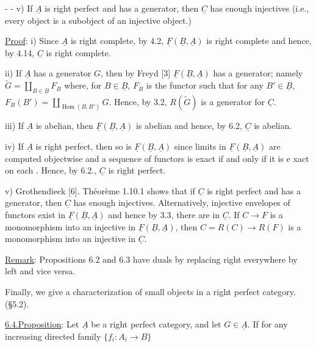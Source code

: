 -  -
v) If $\underline A$ is right perfect and has a generator, then $\underline C$ has enough injectives (i.e., every object is a subobject of an injective object.)

\uline{Proof}: i) Since $\underline A$ is right complete, by 4.2, $\underline F(\underline B,\underline A)$ is right complete and hence, by 4.14, $\underline C$ is right complete.

ii) If $\underline A$ has a generator $G$, then by Freyd [3] $\underline F(\underline B,\underline A)$ has a generator; namely $\widetilde G=\coprod_{B\in\underline B}F_B$ where, for $B\in\underline B$, $F_B$ is the functor such that for any $B'\in\underline B$, $F_B(B')=\coprod_{\operatorname{Hom}(B,B')}G$. Hence, by 3.2, $R(\widetilde G)$ is a generator for $\underline C$.

iii) If $\underline A$ is abelian, then $\underline F(\underline B,\underline A)$ is abelian and hence, by 6.2, $\underline C$ is abelian.

iv) If $\underline A$ is right perfect, then so is $\underline F(\underline B,\underline A)$ since limits in $\underline F(\underline B,\underline A)$ are computed objectwise and a sequence of functors is exact if and only if it is e xact on each . Hence, by 6.2., $\underline C$ is right perfect.

v) Grothendieck [6]. Théorème 1.10.1 shows that if $\underline C$ is right perfect and has a generator, then $\underline C$ has enough injectives. Alternatively, injective envelopes of functors exist in $\underline F(\underline B,\underline A)$ and hence by 3.3, there are  in $\underline C$. If $C\longrightarrow F$ is a monomorphism into an injective in $\underline F(\underline B,\underline A)$, then $C=R(C)\longrightarrow R(F)$ is a monomorphism into an injective in $\underline C$.

\uline{Remark}: Propositions 6.2 and 6.3 have duals by replacing right everywhere by left and vice versa.

Finally, we give a characterization of small objects in a right perfect category. (\S5.2).

\uline{6.4.}\quad\uline{Proposition}: Let $\underline A$ be a right perfect category, and let $G\in\underline A$. If for any increasing directed family $\{f_i:A_i\longrightarrow B\}$
